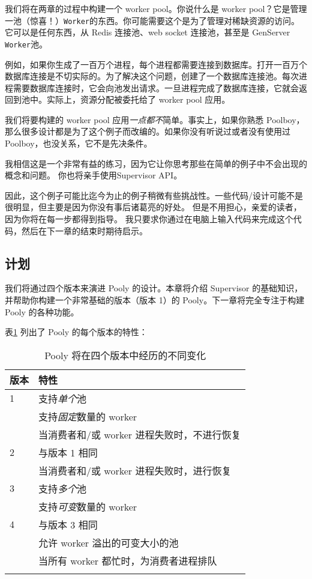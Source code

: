 我们将在两章的过程中构建一个 worker pool。你说什么是 worker
pool？它是管理一池（惊喜！）\texttt{Worker}的东西。你可能需要这个是为了管理对稀缺资源的访问。它可以是任何东西，从
Redis 连接池、web socket 连接池，甚至是 GenServer \texttt{Worker}池。

例如，如果你生成了一百万个进程，每个进程都需要连接到数据库。打开一百万个数据库连接是不切实际的。为了解决这个问题，创建了一个数据库连接池。每次进程需要数据库连接时，它会向池发出请求。一旦进程完成了数据库连接，它就会返回到池中。实际上，资源分配被委托给了
worker pool 应用。

我们将要构建的 worker pool 应用\emph{一点都不}简单。事实上，如果你熟悉
Poolboy，那么很多设计都是为了这个例子而改编的。如果你没有听说过或者没有使用过
Poolboy，也没关系，它不是先决条件。

我相信这是一个非常有益的练习，因为它让你思考那些在简单的例子中不会出现的概念和问题。
你也将亲手使用Supervisor API。

因此，这个例子可能比迄今为止的例子稍微有些挑战性。一些代码/设计可能不是很明显，但主要是因为你没有事后诸葛亮的好处。
但是不用担心，亲爱的读者，因为你将在每一步都得到指导。
我只要求你通过在电脑上输入代码来完成这个代码，然后在下一章的结束时期待启示。

\subsection{计划}

我们将通过四个版本来演进 Pooly 的设计。本章将介绍 Supervisor
的基础知识，并帮助你构建一个非常基础的版本（版本 1）的
Pooly。下一章将完全专注于构建 Pooly 的各种功能。

表\ref{tab:pooly-versions} 列出了 Pooly 的每个版本的特性：

\begin{longtable}[]{@{}ll@{}}
\toprule()
版本 & 特性 \\
\midrule()
\endhead
1 & 支持\emph{单个}池 \\
& 支持\emph{固定}数量的 worker \\
& 当消费者和/或 worker 进程失败时，不进行恢复 \\
2 & 与版本 1 相同 \\
& 当消费者和/或 worker 进程失败时，进行恢复 \\
3 & 支持\emph{多个}池 \\
& 支持\emph{可变}数量的 worker \\
4 & 与版本 3 相同 \\
& 允许 worker 溢出的可变大小的池 \\
& 当所有 worker 都忙时，为消费者进程排队 \\
\bottomrule()
\caption{Pooly 将在四个版本中经历的不同变化}
\label{tab:pooly-versions}
\end{longtable}



